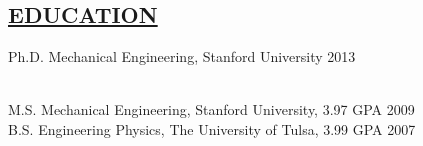\documentclass[line,margin]{res}
\newcommand{\CVOnly}[1]{}
\newcommand{\CVOnly}[1]{#1}
\begin{document}
\address{469 Homer Ave, Palo Alto, CA 94301}
\address{650.762.6844}
\address{adamleeper@gmail.com} 
\address{www.adamleeper.com}

 
\begin{resume}
 
\section{\underline{EDUCATION}}
\vspace{1.0pc}
Ph.D. Mechanical Engineering, Stanford University 
\hfill 2013%
\CVOnly{ {\small
\\[0.0pc]{\bf Advisor:} Professor Kenneth Salisbury
\\[0.0pc]{\bf Thesis:} Robot Telemanipulation in Unstructured Environments: Sensors, Algorithms, Interfaces.
\\[-0.6pc]} }
%
\\[0.0pc]M.S. Mechanical Engineering, Stanford University, 3.97 GPA \hfill  2009 
\\[0.0pc] B.S. Engineering Physics, The University of Tulsa, 3.99 GPA \hfill 2007 
%
%

\end{resume}
\end{document}
